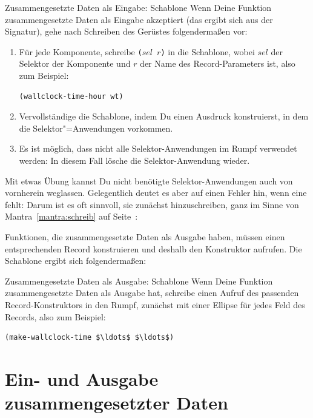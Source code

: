 \begin{konstruktionsanleitung}{Zusammengesetzte Daten als Eingabe:
    Schablone}
  \label{ka:zusammengesetzt-eingabe-schablone}
  Wenn Deine Funktion zusammengesetzte Daten als Eingabe akzeptiert
  (das ergibt sich aus der Signatur), gehe nach Schreiben des Gerüstes
  folgendermaßen vor:
%
\begin{enumerate}
\item Für jede Komponente, schreibe  \texttt{($\mathit{sel}$ $r$)} in die
  Schablone, wobei $\mathit{sel}$ der Selektor der Komponente und $r$ der Name
  des Record-Parameters ist, also zum Beispiel:
\begin{lstlisting}
(wallclock-time-hour wt)
\end{lstlisting}
\item Vervollständige die Schablone, indem Du einen Ausdruck
  konstruierst, in dem die Selektor"=Anwendungen vorkommen.
\item Es ist möglich, dass nicht alle Selektor-Anwendungen im Rumpf
  verwendet werden: In diesem Fall lösche die Selektor-Anwendung
  wieder.
\end{enumerate}
%
\end{konstruktionsanleitung}
%
Mit etwas Übung kannst Du nicht benötigte Selektor-Anwendungen auch von
vornherein weglassen.  Gelegentlich deutet es aber auf einen Fehler
hin, wenn eine fehlt: Darum ist es oft sinnvoll, sie zunächst
hinzuschreiben, ganz im Sinne von Mantra~\ref{mantra:schreib} auf
Seite~\pageref{mantra:schreib}:

\mantraschreib*

\noindent Funktionen, die zusammengesetzte Daten als Ausgabe haben, müssen einen
entsprechenden Record konstruieren und deshalb den Konstruktor
aufrufen.  Die Schablone ergibt sich folgendermaßen:
%
\begin{konstruktionsanleitung}{Zusammengesetzte Daten als Ausgabe:
    Schablone}
    \label{ka:zusammengesetzt-ausgabe-schablone}
  Wenn Deine Funktion zusammengesetzte Daten als Ausgabe hat, schreibe
  einen Aufruf des passenden Record-Konstruktors in den Rumpf,
  zunächst mit einer Ellipse für jedes Feld des Records, also zum
  Beispiel:
\begin{lstlisting}
(make-wallclock-time $\ldots$ $\ldots$)
\end{lstlisting}

\end{konstruktionsanleitung}

\section{Ein- und Ausgabe zusammengesetzter Daten}
\label{sec:armadillo}


